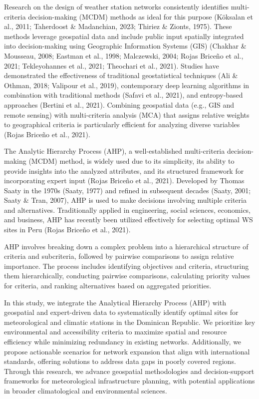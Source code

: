 \documentclass[spanish]{article}
\begin{document}
Research on the design of weather station networks consistently
identifies multi-criteria decision-making (MCDM) methods as ideal for
this purpose (Köksalan et al., 2011; Taherdoost \& Madanchian, 2023;
Thiriez \& Zionts, 1975). These methods leverage geospatial data and
include public input spatially integrated into decision-making using
Geographic Information Systems (GIS) (Chakhar \& Mousseau, 2008; Eastman
et al., 1998; Malczewski, 2004; Rojas Briceño et al., 2021;
Tekleyohannes et al., 2021; Theochari et al., 2021). Studies have
demonstrated the effectiveness of traditional geostatistical techniques
(Ali \& Othman, 2018; Valipour et al., 2019), contemporary deep learning
algorithms in combination with traditional methods (Safavi et al.,
2021), and entropy-based approaches (Bertini et al., 2021). Combining
geospatial data (e.g., GIS and remote sensing) with multi-criteria
analysis (MCA) that assigns relative weights to geographical criteria is
particularly efficient for analyzing diverse variables (Rojas Briceño et
al., 2021).

The Analytic Hierarchy Process (AHP), a well-established multi-criteria
decision-making (MCDM) method, is widely used due to its simplicity, its
ability to provide insights into the analyzed attributes, and its
structured framework for incorporating expert input (Rojas Briceño et
al., 2021). Developed by Thomas Saaty in the 1970s (Saaty, 1977) and
refined in subsequent decades (Saaty, 2001; Saaty \& Tran, 2007), AHP is
used to make decisions involving multiple criteria and alternatives.
Traditionally applied in engineering, social sciences, economics, and
business, AHP has recently been utilized effectively for selecting
optimal WS sites in Peru (Rojas Briceño et al., 2021).

AHP involves breaking down a complex problem into a hierarchical
structure of criteria and subcriteria, followed by pairwise comparisons
to assign relative importance. The process includes identifying
objectives and criteria, structuring them hierarchically, conducting
pairwise comparisons, calculating priority values for criteria, and
ranking alternatives based on aggregated priorities.

In this study, we integrate the Analytical Hierarchy Process (AHP) with
geospatial and expert-driven data to systematically identify optimal
sites for meteorological and climatic stations in the Dominican
Republic. We prioritize key environmental and accessibility criteria to
maximize spatial and resource efficiency while minimizing redundancy in
existing networks. Additionally, we propose actionable scenarios for
network expansion that align with international standards, offering
solutions to address data gaps in poorly covered regions. Through this
research, we advance geospatial methodologies and decision-support
frameworks for meteorological infrastructure planning, with potential
applications in broader climatological and environmental sciences.
\end{document}
